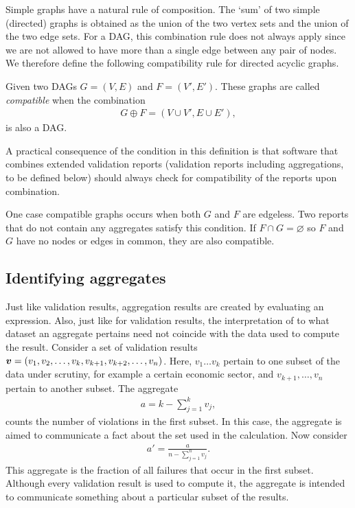 Simple graphs have a natural rule of composition. The `sum' of two simple
(directed) graphs is obtained as the union of the two vertex sets and the union
of the two edge sets. For a DAG, this combination rule does not always apply
since we are not allowed to have more than a single edge between any pair of
nodes.  We therefore define the following compatibility rule for directed acyclic
graphs.
\begin{definition}
\label{def:compatibledag}
Given two DAGs $G=(V,E)$ and $F=(V',E')$. These graphs are called
\emph{compatible} when the combination
\begin{align*}
G\oplus F = (V\cup V', E\cup E'),
\end{align*}
is also a DAG.
\end{definition}
A practical consequence of the condition in this definition is that software
that combines extended validation reports (validation reports including
aggregations, to be defined below) should always check for compatibility of the
reports upon combination. 

One case compatible graphs occurs when both $G$ and $F$ are edgeless. Two
reports that do not contain any aggregates satisfy this condition. If $F\cap
G=\varnothing$ so $F$ and $G$ have no nodes or edges in common, they are also
compatible. 


\subsection{Identifying aggregates}
Just like validation results, aggregation results are created by evaluating an
expression. Also, just like for validation results, the interpretation of to
what dataset an aggregate pertains need not coincide with the data used to
compute the result. Consider a set of validation results
$\boldsymbol{v}=(v_1,v_2,\ldots,v_k,v_{k+1},v_{k+2},\ldots, v_n)$. Here,
$v_1\ldots v_k$ pertain to one subset of the data under scrutiny, for example a
certain economic sector, and $v_{k+1},\ldots,v_n$ pertain to another subset.
The aggregate
\begin{align*}
a = k - \sum_{j=1}^{k}v_j,
\end{align*}
counts the number of violations in the first subset. In this case, the
aggregate is aimed to communicate a fact about the set used in the calculation.
Now consider
\begin{align*}
a' = \frac{a}{n-\sum_{j=1}^n{v_j}}.
\end{align*}
This aggregate is the fraction of all failures that occur in the first subset.
Although every validation result is used to compute it, the aggregate is
intended to communicate something about a particular subset of the results.

